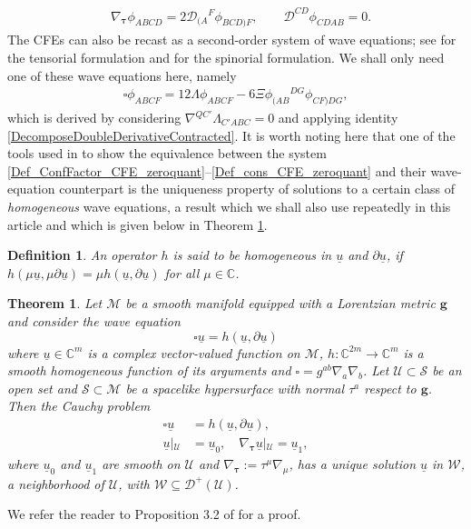 \documentclass[10pt,a4paper]{article}
\theoremstyle{plain}
\newtheorem{theorem}{Theorem}
\newtheorem*{definition}{Definition}
\def\bmg{{\bm g}}
\begin{document}
\begin{align}\label{RescaledWeyl_evo_const}
  & \nabla_{\bm\tau} \phi _{ABCD} = 2 \mathcal{D}
  _{(A}{}^{F}\phi_{BCD)F}, \qquad \mathcal{D} ^{CD}\phi _{CDAB} = 0.
\end{align}
The CFEs can also be recast as a second-order system of wave
equations; see \cite{Pae13} for the tensorial formulation and
\cite{GasVal15} for the spinorial formulation.  We shall only need one
of these wave equations here, namely
\begin{eqnarray}
  \square \phi _{ABCF} = 12 \Lambda \phi _{ABCF} -6 \Xi \phi
  _{(AB}{}^{DG}\phi _{CF)DG},
  \label{Wave_eq_CFE_Weyl}
\end{eqnarray}
which is derived by considering $\nabla^{QC'}\Lambda _{C'ABC}=0$ and
applying identity \eqref{DecomposeDoubleDerivativeContracted}.  It is
worth noting here that one of the tools used in \cite{GasVal15} to
show the equivalence between the system
\eqref{Def_ConfFactor_CFE_zeroquant}--\eqref{Def_cons_CFE_zeroquant}
and their wave-equation counterpart is the uniqueness property of
solutions to a certain class of \textit{homogeneous} wave equations, a
result which we shall also use repeatedly in this article and which is given below in
Theorem \ref{TheoremHomogeneousWave}.

\begin{definition}
{\em An operator $h$ is said to be \textit{homogeneous in} $\underline{u}$
\textit{and} $\partial\underline{u}$, if
$h (\mu\underline{u},\mu\partial\underline{u})=\mu
h(\underline{u}, \partial\underline{u})$ for all
$\mu\in\mathbb{C}$. }
\end{definition}

\begin{theorem}
\label{TheoremHomogeneousWave}
 Let $\mathcal{M}$ be a smooth manifold equipped with a Lorentzian
 metric $\bmg$ and consider the wave equation
\[\square \underline{u}=h (\underline{u},\partial\underline{u})\]
where $\underline{u}\in\mathbb{C}^m$ is a complex vector-valued
function on $\mathcal{M}$, $h:\mathbb{C}^{2m}\rightarrow\mathbb{C}^m$
is a smooth homogeneous function of its arguments and
$\square=g^{ab}\nabla_{a}\nabla_{b}$.  Let
$\mathcal{U}\subset\mathcal{S}$ be an open set and $\mathcal{S}\subset
\mathcal{M}$ be a spacelike hypersurface with normal $\tau^{a}$
respect to $\bmg$. Then the Cauchy problem
\begin{align*}
\square \underline{u}&=h (\underline{u},
\partial\underline{u}),\\ \underline{u}\left|_{\mathcal{U}}\right.&=\underline{u}_0,
\quad
\nabla_{\bm\tau}\underline{u}\left|_{\mathcal{U}}\right.=\underline{u}_1,
\end{align*} 
where $\underline{u}_{0}$ and $\underline{u}_{1}$ are smooth on
$\mathcal{U}$ and $\nabla_{\bm\tau}:= \tau^\mu\nabla_\mu$, has a
unique solution $\underline{u}$ in $\mathcal{W}$,
a neighborhood of $\mathcal{U}$, with $\mathcal{W} \subseteq\mathcal{D}^+(\mathcal{U})$.
\end{theorem}
We refer the reader to Proposition 3.2 of \cite{Tay96c} for a proof.
\end{document}
